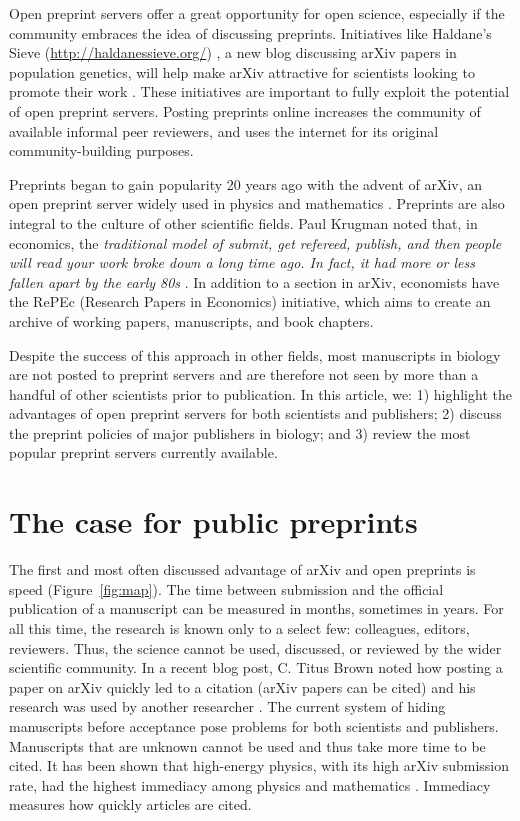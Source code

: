 \documentclass[letterpaper,twocolumn,superscriptaddress,showkeys,longbibliography]{revtex4-1}
\begin{document}
Open preprint servers offer a great opportunity for open science, especially if
the community embraces the idea of discussing preprints. Initiatives like
Haldane's Sieve (\href{http://haldanessieve.org/}{http://haldanessieve.org/}) \cite{coo12}, a
new blog discussing arXiv papers in population genetics, will help make arXiv
attractive for scientists looking to promote their work \cite{lom12}. These
initiatives are important to fully exploit the potential of open preprint
servers. Posting preprints online increases the community of available informal
peer reviewers, and uses the internet for its original community-building
purposes.

Preprints began to gain popularity 20 years ago with the advent of arXiv, an
open preprint server widely used in physics and mathematics \cite{gin11}.
Preprints are also integral to the culture of other scientific fields.  Paul
Krugman noted that, in economics, the \emph{traditional model of submit, get
refereed, publish, and then people will read your work broke down a long time
ago. In fact, it had more or less fallen apart by the early 80s} \cite{kru12}.
In addition to a section in arXiv, economists have the RePEc (Research Papers in
Economics) initiative, which aims to create an archive of working papers,
manuscripts, and book chapters.

Despite the success of this approach in other fields, most manuscripts in
biology are not posted to preprint servers and are therefore not seen by more
than a handful of other scientists prior to publication. In this article, we: 1)
highlight the advantages of open preprint servers for both scientists and
publishers; 2) discuss the preprint policies of major publishers in biology; and
3) review the most popular preprint servers currently available.

\section{The case for public preprints}

The first and most often discussed advantage of arXiv and open preprints is
speed (Figure~\ref{fig:map}). The time between submission and the official
publication of a manuscript can be measured in months, sometimes in years. For
all this time, the research is known only to a select few: colleagues, editors,
reviewers. Thus, the science cannot be used, discussed, or reviewed by the wider
scientific community. In a recent blog post, C. Titus Brown noted how posting a
paper on arXiv quickly led to a citation (arXiv papers can be cited) and his
research was used by another researcher \cite{bro12}. The current system of
hiding manuscripts before acceptance pose problems for both scientists and
publishers. Manuscripts that are unknown cannot be used and thus take more time
to be cited. It has been shown that high-energy physics, with its high arXiv
submission rate, had the highest immediacy among physics and mathematics
\cite{pra05}. Immediacy measures how quickly articles are cited. 
\end{document}
